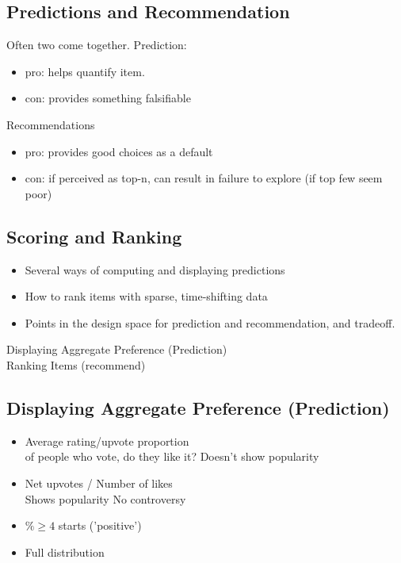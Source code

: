 \documentclass[fleqn,twoside]{article}
\begin{document}
\subsection{Predictions and Recommendation}
Often two come together. Prediction: 

\begin{itemize}
\item pro: helps quantify item.
\item con: provides something falsifiable
\end{itemize}

Recommendations
\begin{itemize}
\item pro:  provides good choices as a default
\item con: if perceived as top-n, can result in failure to explore (if top few seem poor)
\end{itemize}

\subsection{Scoring and Ranking}

\begin{itemize}
\item  Several ways of computing and displaying predictions
\item  How to rank items with sparse, time-shifting data
\item  Points in the design space for prediction and recommendation,  and tradeoff.
\end{itemize}

Displaying Aggregate Preference (Prediction) \\
Ranking Items (recommend)

\subsection{Displaying Aggregate Preference (Prediction)}

\begin{itemize}
\item Average rating/upvote proportion\\
	of people who vote, do they like it?
	Doesn't show popularity
\item Net upvotes / Number of likes\\
	Shows popularity
	No controversy
\item $\%\geq 4$ starts ('positive')
\item Full distribution 
\end{itemize}
\end{document}
